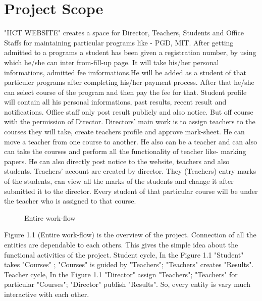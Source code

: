 \documentclass{scrreprt}
\begin{document}
\section{Project Scope}
"IICT WEBSITE" creates a space for Director, Teachers, Students and Office Staffs for maintaining particular programs like - PGD, MIT. 
\newline
After getting admitted to a programs a student has been given a registration number, by using which he/she can inter from-fill-up page. It will take his/her personal informations, admitted fee imformations.He will be added as a student of that particuler programs after completing his/her payment process. After that he/she can select course of the program and then pay the fee for that. Student profile will contain all his personal informations, past results, recent result and notifications.
\newline
Office staff only post result publicly and also notice. But off course with the permission of Director.  
\newline
Directors' main work is to assign teachers to the courses they will take, create teachers profile and approve mark-sheet. He can move a teacher from one course to another. He also can be a teacher and can also can take the courses and perform all the functionality of teacher like- marking papers. He can also directly post notice to the website, teachers and also students.
\newline
Teachers' account are created by director. They (Teachers) entry marks of the students, can view all the marks of the students and change it after submitted it to the director. Every student of that particular course will be under the teacher who is assigned to that course. 
\newline
\begin{figure}
    \centering
    \caption{Entire work-flow}
    \label{fig:IICT WEBSITE}
\end{figure}
\newline
Figure 1.1 (Entire work-flow) is the overview of the project. Connection of all the entities are dependable to each others.  This gives the simple idea about the functional activities of the project. 
\newline
Student cycle, In the Figure 1.1 "Student" takes "Courses" ; "Courses" is guided by "Teachers"; "Teachers" creates "Results". 
\newline
Teacher cycle, In the Figure 1.1 "Director" assign "Teachers"; "Teachers" for particular "Courses"; "Director" publish "Results".
\newline
So, every entity is vary much interactive with each other.
\end{document}
